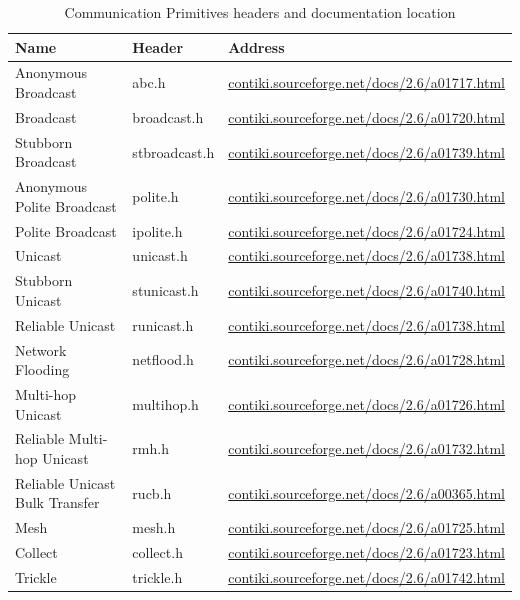 \begin{table}[H]
	\centering
	\begin{tabular}{ | l | l | l | }
		\hline
		Name & Header & Address \\
		\hline
		Anonymous Broadcast & abc.h & \url{contiki.sourceforge.net/docs/2.6/a01717.html} \\
		Broadcast & broadcast.h & \url{contiki.sourceforge.net/docs/2.6/a01720.html} \\
		Stubborn Broadcast & stbroadcast.h & \url{contiki.sourceforge.net/docs/2.6/a01739.html} \\
		Anonymous Polite Broadcast & polite.h & \url{contiki.sourceforge.net/docs/2.6/a01730.html} \\
		Polite Broadcast & ipolite.h & \url{contiki.sourceforge.net/docs/2.6/a01724.html} \\
		Unicast & unicast.h & \url{contiki.sourceforge.net/docs/2.6/a01738.html} \\
		Stubborn Unicast & stunicast.h & \url{contiki.sourceforge.net/docs/2.6/a01740.html} \\
		Reliable Unicast & runicast.h & \url{contiki.sourceforge.net/docs/2.6/a01738.html} \\
		Network Flooding & netflood.h & \url{contiki.sourceforge.net/docs/2.6/a01728.html} \\
		Multi-hop Unicast & multihop.h & \url{contiki.sourceforge.net/docs/2.6/a01726.html} \\
		Reliable Multi-hop Unicast & rmh.h & \url{contiki.sourceforge.net/docs/2.6/a01732.html} \\
		Reliable Unicast Bulk Transfer & rucb.h& \url{contiki.sourceforge.net/docs/2.6/a00365.html} \\
		\hline
		\hline
		Mesh & mesh.h & \url{contiki.sourceforge.net/docs/2.6/a01725.html} \\
		Collect & collect.h & \url{contiki.sourceforge.net/docs/2.6/a01723.html} \\
		Trickle & trickle.h & \url{contiki.sourceforge.net/docs/2.6/a01742.html} \\
		\hline
	\end{tabular}
	\caption{Communication Primitives headers and documentation location}
\end{table}


